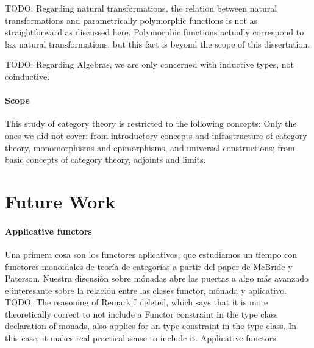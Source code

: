 TODO: Regarding natural transformations, the relation between natural
transformations and parametrically polymorphic functions is not as
straightforward as discussed here. Polymorphic functions actually
correspond to lax natural transformations, but this fact is beyond the
scope of this dissertation.

TODO: Regarding Algebras, we are only concerned with inductive types,
not coinductive.

\paragraph{Scope}

This study of category theory is restricted to the following concepts:
Only the ones we did not cover: from introductory concepts and
infrastructure of category theory, monomorphisms and epimorphisms, and
universal constructions; from basic concepts of category theory,
adjoints and limits.

\section{Future Work}

\paragraph{Applicative functors}

Una primera cosa son los functores aplicativos, que estudiamos un
tiempo con functores monoidales de teoría de categorías a partir del
paper de McBride y Paterson. Nuestra discusión sobre mónadas abre las
puertas a algo más avanzado e interesante sobre la relación entre las
clases functor, mónada y aplicativo. TODO: The reasoning of Remark I
deleted, which says that it is more theoretically correct to not
include a Functor constraint in the type class declaration of monads,
also applies for an  type constraint in the
 type class. In this case, it makes real practical
sense to include it. Applicative functors:
\parencite{mcbride-paterson-2008}

\clearemptydoublepage
